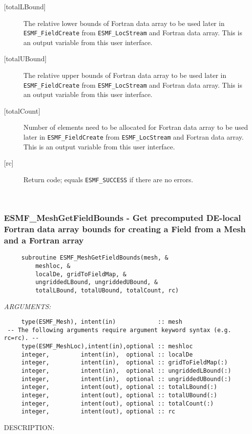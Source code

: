 \begin{description}
   \item [{[totalLBound]}]
         \begin{sloppypar}
         The relative lower bounds of Fortran data array to be used
         later in {\tt ESMF\_FieldCreate} from {\tt ESMF\_LocStream} and Fortran data array.
         This is an output variable from this user interface.
         \end{sloppypar}
   \item [{[totalUBound]}]
         \begin{sloppypar}
         The relative upper bounds of Fortran data array to be used
         later in {\tt ESMF\_FieldCreate} from {\tt ESMF\_LocStream} and Fortran data array.
         This is an output variable from this user interface.
         \end{sloppypar}
   \item [{[totalCount]}]
         Number of elements need to be allocated for Fortran data array to be used
         later in {\tt ESMF\_FieldCreate} from {\tt ESMF\_LocStream} and Fortran data array.
         This is an output variable from this user interface.
  
   \item[{[rc]}]
       Return code; equals {\tt ESMF\_SUCCESS} if there are no errors.
   \end{description} 
 
\mbox{}\hrulefill\ 
 
\subsubsection [ESMF\_MeshGetFieldBounds] {ESMF\_MeshGetFieldBounds - Get precomputed DE-local Fortran data array bounds for creating a Field from a Mesh and a Fortran array}


 
\begin{verbatim}     subroutine ESMF_MeshGetFieldBounds(mesh, &
         meshloc, &
         localDe, gridToFieldMap, &
         ungriddedLBound, ungriddedUBound, &
         totalLBound, totalUBound, totalCount, rc)
     \end{verbatim}{\em ARGUMENTS:}
\begin{verbatim}     type(ESMF_Mesh), intent(in)            :: mesh     
 -- The following arguments require argument keyword syntax (e.g. rc=rc). --
     type(ESMF_MeshLoc),intent(in),optional :: meshloc
     integer,         intent(in),  optional :: localDe
     integer,         intent(in),  optional :: gridToFieldMap(:)    
     integer,         intent(in),  optional :: ungriddedLBound(:)
     integer,         intent(in),  optional :: ungriddedUBound(:)
     integer,         intent(out), optional :: totalLBound(:)
     integer,         intent(out), optional :: totalUBound(:)
     integer,         intent(out), optional :: totalCount(:)
     integer,         intent(out), optional :: rc     
 \end{verbatim}
{\sf DESCRIPTION:\\ }


